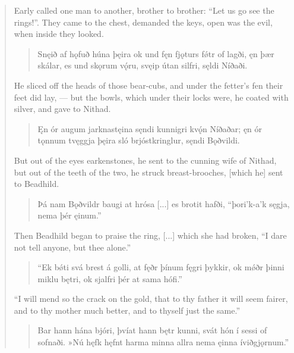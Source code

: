 \begin{verse}
\bvb Early called one man to another, brother to brother: “Let us go see the rings!”. They came to the chest, demanded the keys, open was the evil, when inside they looked.

\begin{verse}
\bva Snęið af hǫfuð \hld húna þęira
ok und fęn fjǫturs \hld fǿtr of lagði,
ęn þær skálar, \hld es und skǫrum vǫ́ru,
svęip útan silfri, \hld sęldi Níðaði. \\%
\end{verse}

\bvb He sliced off the heads of those bear-cubs\footnotemark[1], and under the fetter’s fen their feet did lay, — but the bowls, which under their locks were\footnotemark[2], he coated with silver, and gave to Nithad.

\begin{verse}
\bva Ęn ór augum \hld jarknastęina
sęndi kunnigri \hld kvǫ́n Níðaðar;
ęn ór tǫnnum \hld tvęggja þęira
sló brjóstkringlur, \hld sęndi Bǫðvildi. \\%
\end{verse}

\bvb But out of the eyes earkenstones, he sent to the cunning wife of Nithad, but out of the teeth of the two, he struck breast-brooches, [which he] sent to Beadhild.

\begin{verse}
\bva Þá nam Bǫðvildr \hld baugi at hrósa
[...] \hld es brotit hafði,
“þori’k-a’k sęgja, \hld nema þér ęinum.”  \\%
\end{verse}

\bvb Then Beadhild began to praise the ring, [...] which she had broken, “I dare not tell anyone, but thee alone.”\footnotemark[1]

\begin{verse}
\bva “Ek bǿti svá \hld brest á golli,
at fęðr þínum \hld fęgri þykkir,
ok mǿðr þinni \hld miklu bętri,
ok sjalfri þér \hld at sama hófi.”  \\%
\end{verse}

\bvb “I will mend so the crack on the gold, that to thy father it will seem fairer, and to thy mother much better, and to thyself just the same.”

\begin{verse}
\bva Bar hann hána bjóri, \hld þvíat hann bętr kunni,
svát hón í sessi \hld of sofnaði.
»Nú hęfk hęfnt \hld harma minna
allra nema ęinna \hld íviðgjǫrnum.” \\%
\end{verse}


\end{verse}

